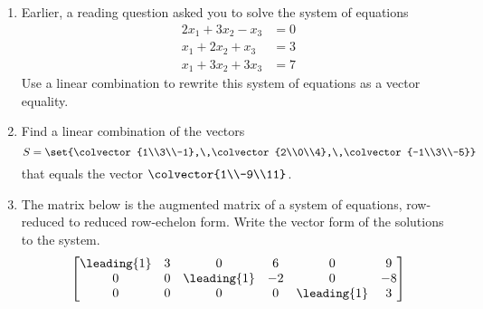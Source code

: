 \begin{enumerate}
%
\item Earlier, a reading question asked you to solve the system of equations
%
\begin{align*}
2x_1 + 3x_2 - x_3&= 0\\
x_1 + 2x_2 + x_3&= 3\\
x_1 + 3x_2 + 3x_3&= 7
\end{align*}
%
Use a linear combination to rewrite this system of equations as a vector equality.
\item Find a linear combination of the vectors
%
\begin{equation*}
S=\set{\colvector{1\\3\\-1},\,\colvector{2\\0\\4},\,\colvector{-1\\3\\-5}}
\end{equation*}
that equals the vector $\colvector{1\\-9\\11}$.
%
\item The matrix below is the augmented matrix of a system of equations, row-reduced to reduced row-echelon form.  Write the vector form of the solutions to the system.
%
\begin{equation*}
\begin{bmatrix}
 \leading{1}&3&0&6&0&9\\
 0&0&\leading{1}&-2&0&-8\\
 0&0&0&0&\leading{1}&3
\end{bmatrix}
\end{equation*}
%
\end{enumerate}